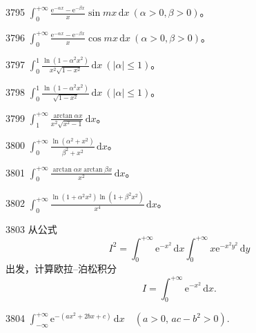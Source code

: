 \begin{prob}[S]{3795}
$\int_{0}^{+\infty} \frac{\mathrm{e}^{-\alpha x} - \mathrm{e}^{-\beta x}}{x} \sin mx\,\mathrm{d}x \ (\alpha > 0, \beta > 0)$。
\end{prob}

\begin{prob}[S]{3796}
$\int_{0}^{+\infty} \frac{\mathrm{e}^{-\alpha x} - \mathrm{e}^{-\beta x}}{x} \cos mx\,\mathrm{d}x \ (\alpha > 0, \beta > 0)$。
\end{prob}


\begin{prob}[S]{3797}
$\int_{0}^{1} \frac{\ln(1 - \alpha^2 x^2)}{x^2 \sqrt{1 - x^2}}\,\mathrm{d}x \ (|\alpha| \leqslant 1)$。
\end{prob}

\begin{prob}[S]{3798}
$\int_{0}^{1} \frac{\ln(1 - \alpha^2 x^2)}{\sqrt{1 - x^2}}\,\mathrm{d}x \ (|\alpha| \leqslant 1)$。
\end{prob}

\begin{prob}[S]{3799}
$\int_{1}^{+\infty} \frac{\arctan \alpha x}{x^2 \sqrt{x^2 - 1}}\,\mathrm{d}x$。
\end{prob}

\begin{prob}[S]{3800}
$\int_{0}^{+\infty} \frac{\ln(\alpha^2 + x^2)}{\beta^2 + x^2}\,\mathrm{d}x$。
\end{prob}

\begin{prob}[S]{3801}
$\int_{0}^{+\infty} \frac{\arctan \alpha x \arctan \beta x}{x^2}\,\mathrm{d}x$。
\end{prob}

\begin{prob}[S]{3802}
$\int_{0}^{+\infty} \frac{\ln(1 + \alpha^2 x^2)\ln(1 + \beta^2 x^2)}{x^4}\,\mathrm{d}x$。
\end{prob}

\begin{prob}[M]{3803}
从公式
\[
I^2 = \int_{0}^{+\infty} \mathrm{e}^{-x^2}\,\mathrm{d}x \int_{0}^{+\infty} x\mathrm{e}^{-x^2 y^2}\,\mathrm{d}y
\]
出发，计算欧拉--泊松积分
\[
I = \int_{0}^{+\infty} \mathrm{e}^{-x^2}\,\mathrm{d}x.
\]
\end{prob}


\begin{prob}[S]{3804}
$\displaystyle \int_{-\infty}^{+\infty} \mathrm{e}^{-(ax^2+2bx+c)} \,\mathrm{d}x \quad (a>0,\, ac-b^2>0)$.
\end{prob}

